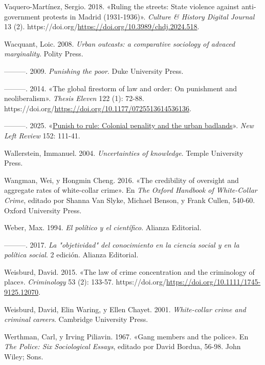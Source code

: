 \documentclass[
  spanish,
  letterpaper,
  DIV=11,
  numbers=noendperiod]{scrreprt}
\newlength{\cslhangindent}
\newenvironment{CSLReferences}[2] %
 {\begin{list}{}{%
  \setlength{\itemindent}{0pt}
  \setlength{\leftmargin}{0pt}
  \setlength{\parsep}{0pt}
  \ifodd #1
   \setlength{\leftmargin}{\cslhangindent}
   \setlength{\itemindent}{-1\cslhangindent}
  \fi
  \setlength{\itemsep}{#2\baselineskip}}}
 {\end{list}}
\begin{document}
\begin{CSLReferences}{1}{0}
Vaquero-Martínez, Sergio. 2018. {«Ruling the streets: State violence
against anti-government protests in Madrid (1931-1936)»}. \emph{Culture
\& History Digital Journal} 13 (2).
https://doi.org/\url{https://doi.org/10.3989/chdj.2024.518}.

Wacquant, Loic. 2008. \emph{Urban outcasts: a comparative sociology of
advaced marginality}. Polity Press.

---------. 2009. \emph{Punishing the poor}. Duke University Press.

---------. 2014. {«The global firestorm of law and order: On punishment
and neoliberalism»}. \emph{Thesis Eleven} 122 (1): 72-88.
https://doi.org/\url{https://doi.org/10.1177/0725513614536136}.

---------. 2025. {«\href{}{Punish to rule: Colonial penality and the
urban badlands}»}. \emph{New Left Review} 152: 111-41.

Wallerstein, Immanuel. 2004. \emph{Uncertainties of knowledge}. Temple
University Press.

Wangman, Wei, y Hongmin Cheng. 2016. {«The credibility of oversight and
aggregate rates of white-collar crime»}. En \emph{The Oxford Handbook of
White-Collar Crime}, editado por Shanna Van Slyke, Michael Benson, y
Frank Cullen, 540-60. Oxford University Press.

Weber, Max. 1994. \emph{El político y el científico}. Alianza Editorial.

---------. 2017. \emph{La "objetividad" del conocimiento en la ciencia
social y en la política social}. 2 edición. Alianza Editorial.

Weisburd, David. 2015. {«The law of crime concentration and the
criminology of place»}. \emph{Criminology} 53 (2): 133-57.
https://doi.org/\url{https://doi.org/10.1111/1745-9125.12070}.

Weisburd, David, Elin Waring, y Ellen Chayet. 2001. \emph{White-collar
crime and criminal careers}. Cambridge University Press.

Werthman, Carl, y Irving Piliavin. 1967. {«Gang members and the
police»}. En \emph{The Police: Six Sociological Essays}, editado por
David Bordua, 56-98. John Wiley; Sons.


\end{CSLReferences}
\end{document}
